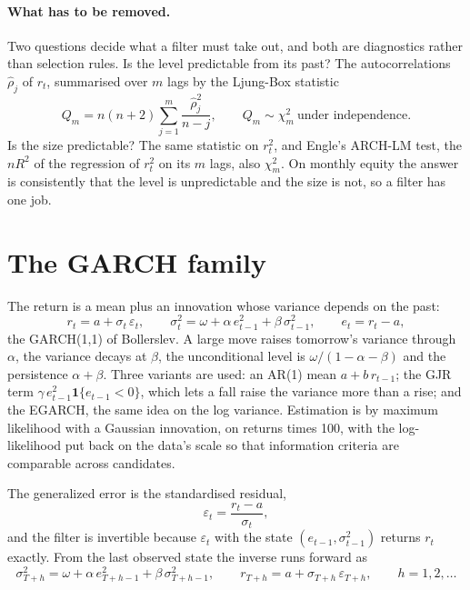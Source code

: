 \documentclass[11pt]{article}
\begin{document}
\paragraph{What has to be removed.} Two questions decide what a filter must
take out, and both are diagnostics rather than selection rules. Is the level
predictable from its past? The autocorrelations
$\hat\rho_j$ of $r_t$, summarised over $m$ lags by the Ljung-Box statistic
\begin{equation}\label{eq:ljung_box}
  Q_m = n(n+2) \sum_{j=1}^{m} \frac{\hat\rho_j^2}{n - j},
  \qquad Q_m \sim \chi^2_m \ \text{under independence}.
\end{equation}
Is the size predictable? The same statistic on $r_t^2$, and Engle's ARCH-LM
test, the $nR^2$ of the regression of $r_t^2$ on its $m$ lags, also
$\chi^2_m$. On monthly equity the answer is consistently that the level is
unpredictable and the size is not, so a filter has one job.

\section{The GARCH family}\label{sec:garch}

The return is a mean plus an innovation whose variance depends on the past:
\begin{equation}\label{eq:garch}
  r_t = a + \sigma_t\, \varepsilon_t, \qquad
  \sigma_t^2 = \omega + \alpha\, e_{t-1}^2 + \beta\, \sigma_{t-1}^2, \qquad
  e_t = r_t - a ,
\end{equation}
the GARCH(1,1) of Bollerslev. A large move raises tomorrow's variance through
$\alpha$, the variance decays at $\beta$, the unconditional level is
$\omega/(1 - \alpha - \beta)$ and the persistence $\alpha + \beta$. Three
variants are used: an AR(1) mean $a + b\,r_{t-1}$; the GJR term
$\gamma\, e_{t-1}^2 \mathbf 1\{e_{t-1} < 0\}$, which lets a fall raise the
variance more than a rise; and the EGARCH, the same idea on the log variance.
Estimation is by maximum likelihood with a Gaussian innovation, on returns
times 100, with the log-likelihood put back on the data's scale so that
information criteria are comparable across candidates.

The generalized error is the standardised residual,
\begin{equation}\label{eq:garch_error}
  \varepsilon_t = \frac{r_t - a}{\sigma_t} ,
\end{equation}
and the filter is invertible because $\varepsilon_t$ with the state
$(e_{t-1}, \sigma_{t-1}^2)$ returns $r_t$ exactly. From the last observed
state the inverse runs forward as
\begin{equation}\label{eq:garch_path}
  \sigma_{T+h}^2 = \omega + \alpha\, e_{T+h-1}^2 + \beta\, \sigma_{T+h-1}^2,
  \qquad r_{T+h} = a + \sigma_{T+h}\, \varepsilon_{T+h}, \qquad h = 1, 2, \dots
\end{equation}
\end{document}
